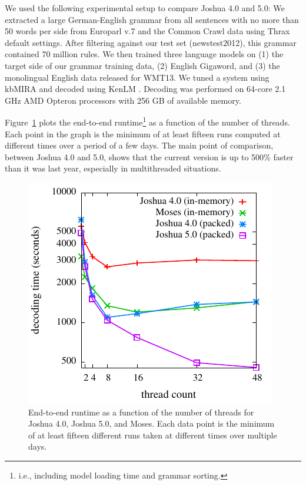 \documentclass[11pt]{article}
\begin{document}
We used the following experimental setup to compare Joshua 4.0 and
5.0: We extracted a large German-English grammar from all sentences
with no more than 50 words per side from Europarl v.7
\cite{koehn2005europarl} and the Common Crawl data using Thrax default
settings.  After filtering against our test set (newstest2012), this
grammar contained 70 million rules.  We then trained three language
models on (1) the target side of our grammar training data, (2)
English Gigaword, and (3) the monolingual English data released for
WMT13. We tuned a system using kbMIRA and decoded using KenLM
\cite{KenLM}.  Decoding was performed on 64-core 2.1 GHz AMD Opteron
processors with 256 GB of available memory.

Figure~\ref{fig:cmp} plots the end-to-end runtime\footnote{i.e.,
  including model loading time and grammar sorting.} as a function of
the number of threads.  Each point in the graph is the minimum of at
least fifteen runs computed at different times over a period of a few
days.  The main point of comparison, between Joshua 4.0 and 5.0, shows
that the current version is up to 500\% faster than it was last year,
especially in multithreaded situations.

\begin{figure}[!t]
  \begin{center}
    \includegraphics[width=0.99\linewidth]{plots/runtimes.pdf}
  \end{center}
  \caption{End-to-end runtime as a function of the number of threads
    for Joshua 4.0, Joshua 5.0, and Moses. Each data point is the
    minimum of at least fifteen different runs taken at different
    times over multiple days.}
  \label{fig:cmp}
\end{figure}
\end{document}

